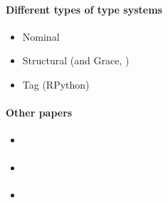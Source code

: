 \paragraph{Different types of type systems}


\begin{itemize}
    \item Nominal \cite{Muehlboeck2017}
    \item Structural \cite{Richards2017} (and Grace, \cite{Boyland2014})
    \item Tag (RPython) \cite{Greenman2018}
\end{itemize}

\paragraph{Other papers}

\begin{itemize}
    \item \cite{Bloom2009}
    \item \cite{Castagna2017}
    \item \cite{Stulova2016}
\end{itemize}
